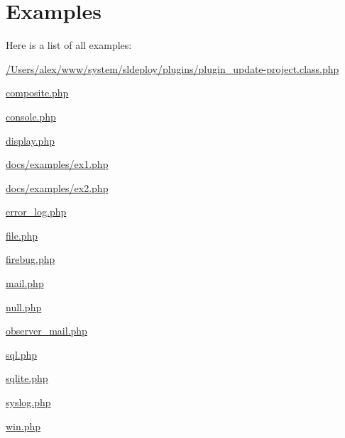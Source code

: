 \section{Examples}
Here is a list of all examples:\begin{DoxyCompactItemize}
\item 
\hyperlink{_2_users_2alex_2www_2system_2sldeploy_2plugins_2plugin_update-project_8class_8php-example}{/Users/alex/www/system/sldeploy/plugins/plugin\_\-update-\/project.class.php}
\item 
\hyperlink{composite_8php-example}{composite.php}
\item 
\hyperlink{console_8php-example}{console.php}
\item 
\hyperlink{display_8php-example}{display.php}
\item 
\hyperlink{docs_2examples_2ex1_8php-example}{docs/examples/ex1.php}
\item 
\hyperlink{docs_2examples_2ex2_8php-example}{docs/examples/ex2.php}
\item 
\hyperlink{error_log_8php-example}{error\_\-log.php}
\item 
\hyperlink{file_8php-example}{file.php}
\item 
\hyperlink{firebug_8php-example}{firebug.php}
\item 
\hyperlink{mail_8php-example}{mail.php}
\item 
\hyperlink{null_8php-example}{null.php}
\item 
\hyperlink{observer_mail_8php-example}{observer\_\-mail.php}
\item 
\hyperlink{sql_8php-example}{sql.php}
\item 
\hyperlink{sqlite_8php-example}{sqlite.php}
\item 
\hyperlink{syslog_8php-example}{syslog.php}
\item 
\hyperlink{win_8php-example}{win.php}
\end{DoxyCompactItemize}
